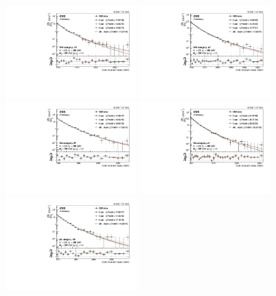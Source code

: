 \begin{figure}[h!]
\centering
\includegraphics[width=0.45\textwidth]{figures/analysis/search2/AN-16-235/plots/WWHP.pdf}
\includegraphics[width=0.45\textwidth]{figures/analysis/search2/AN-16-235/plots/WWLP.pdf}\\
\includegraphics[width=0.45\textwidth]{figures/analysis/search2/AN-16-235/plots/WZHP.pdf}
\includegraphics[width=0.45\textwidth]{figures/analysis/search2/AN-16-235/plots/WZLP.pdf}\\
\includegraphics[width=0.45\textwidth]{figures/analysis/search2/AN-16-235/plots/ZZHP.pdf}

\end{figure}
